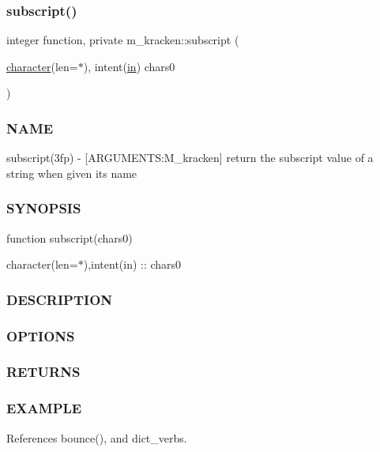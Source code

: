 \subsubsection{\texorpdfstring{subscript()}{subscript()}}
{\footnotesize\ttfamily integer function, private m\+\_\+kracken\+::subscript (\begin{DoxyParamCaption}\item[{\hyperlink{option__stopwatch_83_8txt_abd4b21fbbd175834027b5224bfe97e66}{character}(len=$\ast$), intent(\hyperlink{M__journal_83_8txt_afce72651d1eed785a2132bee863b2f38}{in})}]{chars0 }\end{DoxyParamCaption})\hspace{0.3cm}{\ttfamily [private]}}



\subsubsection*{N\+A\+ME}

subscript(3fp) -\/ \mbox{[}A\+R\+G\+U\+M\+E\+N\+TS\+:M\+\_\+kracken\mbox{]} return the subscript value of a string when given it\textquotesingle{}s name \subsubsection*{S\+Y\+N\+O\+P\+S\+IS}

function subscript(chars0)

character(len=$\ast$),intent(in) \+:\+: chars0 \subsubsection*{D\+E\+S\+C\+R\+I\+P\+T\+I\+ON}

\subsubsection*{O\+P\+T\+I\+O\+NS}

\subsubsection*{R\+E\+T\+U\+R\+NS}

\subsubsection*{E\+X\+A\+M\+P\+LE}

References bounce(), and dict\+\_\+verbs.

